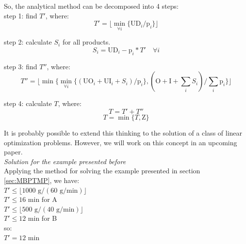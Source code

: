 \documentclass[authoryear,preprint,12pt]{elsarticle}
\begin{document}
So, the analytical method can be decomposed into 4 steps: \\

step 1: find $T'$, where:
\begin{equation}
T' = \lfloor{\min_{\forall i} \{\textrm{UD}_i / \textrm{p}_i\}}\rfloor
\end{equation}

step 2: calculate $S_i$ for all products.
\begin{equation}
\label{eq:unmet}
S_i = \textrm{UD}_i - \textrm{p}_i * T' \quad \forall i
\end{equation}

step 3: find $T''$, where:
\begin{equation}
T'' = \lfloor{\min \{\min_{\forall i} \{(\textrm{UO}_i + \textrm{UI}_i + S_i) / \textrm{p}_i\},(\textrm{O} + \textrm{I} + \sum_i {S_i}) / \sum_i {\textrm{p}_i}\}}\rfloor
\end{equation}

step 4: calculate $T$, where: 
\begin{equation}
T = T' + T''
\end{equation}
\begin{equation}
T = \min \{T , \textrm{Z}\}
\end{equation}

It is probably possible to extend this thinking to the solution of a class of linear optimization problems. However, we will work on this concept in an upcoming paper. \\

\emph{Solution for the example presented before} \\

Applying the method for solving the example presented in section \ref{sec:MBPTMP}, we have: \\

$T' \leq \lfloor{1000 \textrm{ g} / (60 \textrm{ g}/\textrm{min})}\rfloor$ \\

$T' \leq 16 \textrm{ min}$ \quad for A \\

$T' \leq \lfloor{500 \textrm{ g} / (40 \textrm{ g}/\textrm{min})}\rfloor$ \\

$T' \leq 12 \textrm{ min}$ \quad for B \\

so: \\

$T' = 12 \textrm{ min}$ \\
\end{document}
